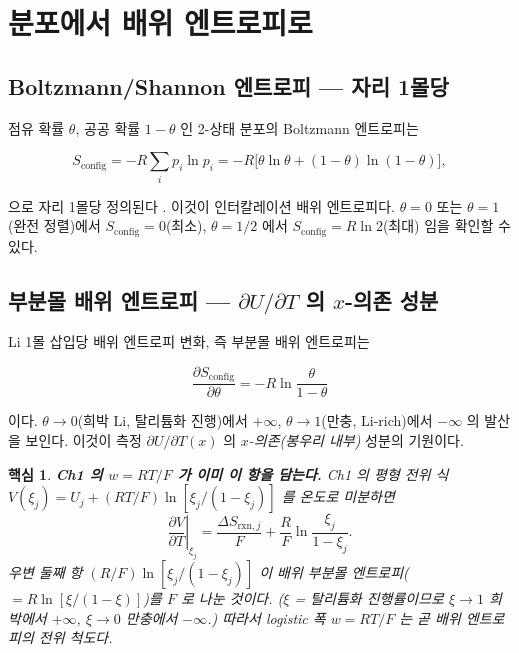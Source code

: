 \documentclass[11pt,a4paper]{article}
\newtheorem*{keybox}{핵심}
\newcommand{\rxn}{\mathrm{rxn}}
\newcommand{\config}{\mathrm{config}}
\begin{document}
\section{분포에서 배위 엔트로피로}\label{sec:config}

\subsection{Boltzmann/Shannon 엔트로피 — 자리 1몰당}

점유 확률 $\theta$, 공공 확률 $1-\theta$ 인 2-상태 분포의 Boltzmann 엔트로피는

\begin{equation}
  S_\config = -R\sum_i p_i \ln p_i
  = -R\bigl[\theta\ln\theta + (1-\theta)\ln(1-\theta)\bigr],
  \label{eq:Sconfig}
\end{equation}

으로 자리 1몰당 정의된다 \cite{newman,huggins2009}. 이것이 인터칼레이션 배위 엔트로피다.
$\theta = 0$ 또는 $\theta = 1$(완전 정렬)에서 $S_\config = 0$(최소),
$\theta = 1/2$ 에서 $S_\config = R\ln 2$(최대) 임을 확인할 수 있다.

\subsection{부분몰 배위 엔트로피 — $\partial U/\partial T$ 의 $x$-의존 성분}

Li 1몰 삽입당 배위 엔트로피 변화, 즉 부분몰 배위 엔트로피는

\begin{equation}
  \boxed{\;
    \frac{\partial S_\config}{\partial \theta}
    = -R\ln\frac{\theta}{1-\theta}
  \;}
  \label{eq:dSconfig}
\end{equation}

이다. $\theta \to 0$(희박 Li, 탈리튬화 진행)에서 $+\infty$,
$\theta \to 1$(만충, Li-rich)에서 $-\infty$ 의 발산을 보인다.
이것이 측정 $\partial U/\partial T(x)$ 의 \emph{$x$-의존(봉우리 내부)} 성분의 기원이다.

\begin{keybox}
\textbf{Ch1 의 $w = RT/F$ 가 이미 이 항을 담는다.}
Ch1 의 평형 전위 식 $V(\xi_j) = U_j + (RT/F)\ln[\xi_j/(1-\xi_j)]$ 를 온도로 미분하면
\[
  \left.\frac{\partial V}{\partial T}\right|_{\xi_j}
  = \frac{\Delta S_{\rxn,j}}{F} + \frac{R}{F}\ln\frac{\xi_j}{1-\xi_j}.
\]
우변 둘째 항 $(R/F)\ln[\xi_j/(1-\xi_j)]$ 이 배위 부분몰 엔트로피($=R\ln[\xi/(1-\xi)]$)를 $F$ 로 나눈 것이다.
($\xi$ = 탈리튬화 진행률이므로 $\xi\to1$ 희박에서 $+\infty$, $\xi\to0$ 만충에서 $-\infty$.)
따라서 logistic 폭 $w = RT/F$ 는 곧 배위 엔트로피의 전위 척도다.
\end{keybox}
\end{document}
